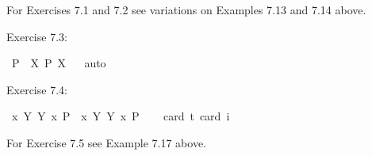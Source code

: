 \begin{isabellebody}
%
\begin{isamarkuptext}%
For Exercises 7.1 and 7.2 see variations on Examples 7.13 and 7.14 above.%
\end{isamarkuptext}\isamarkuptrue%
%
\begin{isamarkuptext}%
Exercise 7.3:%
\end{isamarkuptext}\isamarkuptrue%
\isamarkupfalse%
\ {\isachardoublequoteopen}{\isasymlfloor}\isactrlbold {\isasymdiamond}\isactrlbold {\isasymexists}{\isacharparenleft}P{\isacharcolon}{\isacharcolon}{\isasymup}{\isasymlangle}{\isasymzero}{\isasymrangle}{\isacharparenright}\ \isactrlbold {\isasymrightarrow}\ {\isacharparenleft}\isactrlbold {\isasymexists}X{\isacharcolon}{\isacharcolon}{\isasymup}{\isasymzero}{\isachardot}\ \isactrlbold {\isasymdiamond}{\isacharparenleft}P\ {\isasymdownharpoonleft}X{\isacharparenright}{\isacharparenright}{\isasymrfloor}{\isachardoublequoteclose}%
\ %
%
\isamarkupfalse%
\ auto%
%
%
%
\begin{isamarkuptext}%
Exercise 7.4:%
\end{isamarkuptext}\isamarkuptrue%
\isamarkupfalse%
\ {\isachardoublequoteopen}{\isasymlfloor}\isactrlbold {\isasymdiamond}{\isacharparenleft}\isactrlbold {\isasymexists}x{\isacharcolon}{\isacharcolon}{\isasymzero}{\isachardot}\ {\isacharparenleft}{\isasymlambda}Y{\isachardot}\ Y\ x{\isacharparenright}\ \isactrlbold {\isasymdown}{\isacharparenleft}P{\isacharcolon}{\isacharcolon}{\isasymup}{\isasymlangle}{\isasymzero}{\isasymrangle}{\isacharparenright}{\isacharparenright}\ \isactrlbold {\isasymrightarrow}\ {\isacharparenleft}\isactrlbold {\isasymexists}x{\isachardot}\ {\isacharparenleft}{\isasymlambda}Y{\isachardot}\ \isactrlbold {\isasymdiamond}{\isacharparenleft}Y\ x{\isacharparenright}{\isacharparenright}\ \isactrlbold {\isasymdown}P{\isacharparenright}{\isasymrfloor}{\isachardoublequoteclose}\ \isanewline
\ \ \isamarkupfalse%
{\isacharbrackleft}card\ {\isacharprime}t{\isacharequal}{}{\isacharcomma}\ card\ i{\isacharequal}{}{\isacharbrackright}%
\ %
%
\isamarkupfalse%
\ %
%
%
%
%
\begin{isamarkuptext}%
For Exercise 7.5 see Example 7.17 above.%
\end{isamarkuptext}\isamarkuptrue%
%
\isamarkuptrue%
%
\isamarkuptrue%
%
\begin{isamarkuptext}%

\end{isamarkuptext}
\end{isabellebody}
